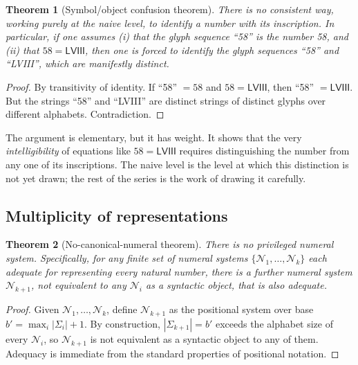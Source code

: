 \documentclass[12pt]{article}
\newtheorem{theorem}{Theorem}[section]
\theoremstyle{definition}
\theoremstyle{remark}
\begin{document}
\begin{theorem}[Symbol/object confusion theorem]
\label{thm:symbol-object}
There is no consistent way, working purely at the naive level, to identify
a number with its inscription. In particular, if one assumes (i) that the
glyph sequence ``58'' \emph{is} the number 58, and (ii) that
$58 = \mathsf{LVIII}$, then one is forced to identify the glyph sequences
``58'' and ``\textsf{LVIII}'', which are manifestly distinct.
\end{theorem}

\begin{proof}
By transitivity of identity. If ``58'' $= 58$ and $58 = \mathsf{LVIII}$,
then ``58'' $= \mathsf{LVIII}$. But the strings ``58'' and
``\textsf{LVIII}'' are distinct strings of distinct glyphs over different
alphabets. Contradiction.
\end{proof}

The argument is elementary, but it has weight. It shows that the very
\emph{intelligibility} of equations like $58 = \mathsf{LVIII}$ requires
distinguishing the number from any one of its inscriptions. The naive
level is the level at which this distinction is not yet drawn; the rest
of the series is the work of drawing it carefully.

\subsection{Multiplicity of representations}

\begin{theorem}[No-canonical-numeral theorem]
\label{thm:no-canonical-numeral}
There is no privileged numeral system. Specifically, for any finite set
of numeral systems $\{\mathcal{N}_1, \ldots, \mathcal{N}_k\}$ each adequate
for representing every natural number, there is a further numeral system
$\mathcal{N}_{k+1}$, not equivalent to any $\mathcal{N}_i$ as a
syntactic object, that is also adequate.
\end{theorem}

\begin{proof}
Given $\mathcal{N}_1, \ldots, \mathcal{N}_k$, define $\mathcal{N}_{k+1}$
as the positional system over base $b' = \max_i |\Sigma_i| + 1$. By
construction, $|\Sigma_{k+1}| = b'$ exceeds the alphabet size of every
$\mathcal{N}_i$, so $\mathcal{N}_{k+1}$ is not equivalent as a syntactic
object to any of them. Adequacy is immediate from the standard properties
of positional notation.
\end{proof}
\end{document}
